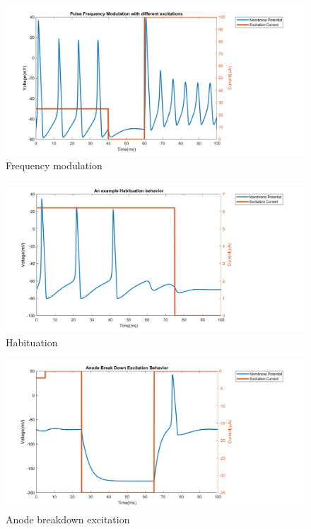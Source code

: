 \documentclass{IEEEtran}
\begin{document}
\begin{figure}[h]
\centering
\includegraphics[width=\textwidth]{Fig2.png}
\caption{Frequency modulation}\label{fig:fm}
\end{figure}

\begin{figure}[h]
\centering
\includegraphics[width=\textwidth]{Fig3.png}
\caption{Habituation}\label{fig:habit}
\end{figure}

\begin{figure}[h]
\centering
\includegraphics[width=\textwidth]{Fig4.png}
\caption{Anode breakdown excitation}\label{fig:abe}
\end{figure}
\end{document}
